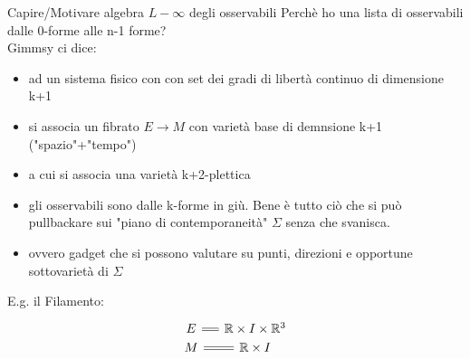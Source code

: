 \documentclass[beamer,10pt]{standalone}
\begin{document}
  \begin{frame}[fragile]{Capire/Motivare algebra $L-\infty$ degli osservabili}
	Perchè ho una lista di osservabili dalle 0-forme alle n-1 forme?\\
	Gimmsy ci dice:
	\begin{itemize}
		\item ad un sistema fisico con con set dei gradi di libertà continuo di dimensione k+1
		\item si associa un fibrato $E \to M$ con varietà base di demnsione k+1 ("spazio"+"tempo")
		\item a cui si associa una varietà k+2-plettica
		\item gli osservabili sono dalle k-forme in giù. Bene è tutto ciò che si può pullbackare 
			sui "piano di contemporaneità" $\Sigma$ senza che svanisca.
		\item ovvero gadget che si possono valutare su punti, direzioni e opportune sottovarietà di $\Sigma$
	\end{itemize}
  	E.g. il Filamento:
		\[ 
	\begin{tikzcd}[column sep= small,row sep=0ex]
		E \ar[r,equal] & \mathbb{R}\times I \times \mathbb{R}^3 \\
		M \ar[r,equal] & \mathbb{R}\times I
	\end{tikzcd} 
	\]	
  \end{frame}
\end{document}
